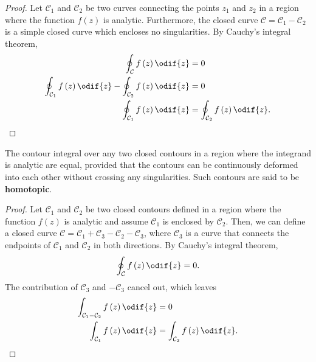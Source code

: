 \documentclass{article}
\begin{document}
\begin{proof}
    Let \(\mathcal{C}_1\) and \(\mathcal{C}_2\) be two curves connecting
    the points \(z_1\) and \(z_2\) in a region where the function
    \(f\left( z \right)\) is analytic. Furthermore, the closed curve
    \(\mathcal{C} = \mathcal{C}_1 - \mathcal{C}_2\) is a simple closed
    curve which encloses no singularities. By Cauchy's integral theorem,
    \begin{align*}
        \oint_{\mathcal{C}} f\left( z \right) \odif{z}                                                      & = 0                                                 \\
        \oint_{\mathcal{C}_1} f\left( z \right) \odif{z} - \oint_{\mathcal{C}_2} f\left( z \right) \odif{z} & = 0                                                 \\
        \oint_{\mathcal{C}_1} f\left( z \right) \odif{z}                                                    & = \oint_{\mathcal{C}_2} f\left( z \right) \odif{z}.
    \end{align*}
\end{proof}
\begin{corollary}
    The contour integral over any two closed contours in a region where
    the integrand is analytic are equal, provided that the contours can
    be continuously deformed into each other without crossing any
    singularities. Such contours are said to be \textbf{homotopic}.
\end{corollary}
\begin{proof}
    Let \(\mathcal{C}_1\) and \(\mathcal{C}_2\) be two closed contours
    defined in a region where the function \(f\left( z \right)\) is
    analytic and assume \(\mathcal{C}_1\) is enclosed by
    \(\mathcal{C}_2\). Then, we can define a closed curve
    \(\mathcal{C} = \mathcal{C}_1 + \mathcal{C}_3 - \mathcal{C}_2 - \mathcal{C}_3\),
    where \(\mathcal{C}_3\) is a curve that connects the endpoints of
    \(\mathcal{C}_1\) and \(\mathcal{C}_2\) in both directions. By
    Cauchy's integral theorem,
    \begin{equation*}
        \oint_{\mathcal{C}} f\left( z \right) \odif{z} = 0.
    \end{equation*}
    The contribution of \(\mathcal{C}_3\) and \(-\mathcal{C}_3\) cancel
    out, which leaves
    \begin{align*}
        \int_{\mathcal{C}_1 - \mathcal{C}_2} f\left( z \right) \odif{z} & = 0                                                \\
        \int_{\mathcal{C}_1} f\left( z \right) \odif{z}                 & = \int_{\mathcal{C}_2} f\left( z \right) \odif{z}.
    \end{align*}
\end{proof}
\end{document}
